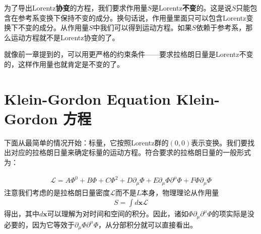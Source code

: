 为了导出Lorentz{\bf 协变}的方程，我们要求作用量$S$是Lorentz{\bf 不变}的。这是说$S$只能包含在参考系变换下保持不变的成分。换句话说，作用量里面只可以包含Lorentz变换下不变的成分。从作用量$S$中我们可以得到运动方程。如果$S$依赖于参考系，那么运动方程就不是Lorentz协变的了。

就像前一章提到的，可以用更严格的约束条件——要求拉格朗日量是Lorentz不变的，这样作用量也就肯定是不变的了。

\section[Klein-Gordon 方程]{Klein-Gordon Equation \quad Klein-Gordon 方程}\label{sec6.2}

下面从最简单的情况开始：标量，它按照Lorentz群的$(0,0)$表示变换。我们要找出对应的拉格朗日量来确定标量的运动方程。符合要求的拉格朗日量的一般形式为：

\begin{align}
\label{equ6.1}
\mathscr{L} = A\Phi^0+B\Phi+C\Phi^2+D\partial_\mu\Phi+E\partial_\mu\Phi\partial^\mu\Phi+F\Phi\partial_\mu\Phi
\end{align}
注意我们考虑的是拉格朗日量密度$\mathscr{L}$而不是$L$本身，物理理论从作用量
\begin{align}
\label{equ6.2}
S = \int d\mathbf{x} \mathscr{L}
\end{align}
得出，其中$d \mathbf{x}$可以理解为对时间和空间的积分。因此，诸如$\Phi\partial_\mu\partial^\mu\Phi$的项实际是没必要的，因为它等效于$\partial_\mu\Phi\partial^\mu\Phi$，从分部积分就可以直接看出。

